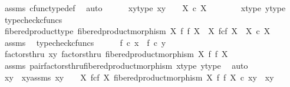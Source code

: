 \begin{isabellebody}
\ assms{\isacharparenleft}{\kern0pt}{}{\isacharparenright}{\kern0pt}\ cfunc{\isacharunderscore}{\kern0pt}type{\isacharunderscore}{\kern0pt}def\ \isamarkupfalse%
\ auto\isanewline
\isanewline
\ \ \ \ \isamarkupfalse%
\ x{\isacharunderscore}{\kern0pt}y{\isacharunderscore}{\kern0pt}type{\isacharcolon}{\kern0pt}\ {\isachardoublequoteopen}{\isasymlangle}x{\isacharcomma}{\kern0pt}y{\isasymrangle}\ {\isacharcolon}{\kern0pt}\ {\isasymone}\ {\isasymrightarrow}\ X\ {\isasymtimes}\isactrlsub c\ X{\isachardoublequoteclose}\isanewline
\ \ \ \ \ \ \isamarkupfalse%
\ x{\isacharunderscore}{\kern0pt}type{}\ y{\isacharunderscore}{\kern0pt}type{}\ \isamarkupfalse%
\ {\isacharparenleft}{\kern0pt}typecheck{\isacharunderscore}{\kern0pt}cfuncs{\isacharparenright}{\kern0pt}\isanewline
\ \ \ \ \isamarkupfalse%
\ fibered{\isacharunderscore}{\kern0pt}product{\isacharunderscore}{\kern0pt}type{\isacharcolon}{\kern0pt}\ {\isachardoublequoteopen}fibered{\isacharunderscore}{\kern0pt}product{\isacharunderscore}{\kern0pt}morphism\ X\ f\ f\ X\ {\isacharcolon}{\kern0pt}\ X\ \isactrlbsub f\isactrlesub {\isasymtimes}\isactrlsub c\isactrlbsub f\isactrlesub \ X\ {\isasymrightarrow}\ X\ {\isasymtimes}\isactrlsub c\ X{\isachardoublequoteclose}\isanewline
\ \ \ \ \ \ \isamarkupfalse%
\ assms\ \isamarkupfalse%
\ typecheck{\isacharunderscore}{\kern0pt}cfuncs\isanewline
\isanewline
\ \ \ \ \isamarkupfalse%
\ {\isachardoublequoteopen}f\ {\isasymcirc}\isactrlsub c\ x\ {\isacharequal}{\kern0pt}\ f\ {\isasymcirc}\isactrlsub c\ y{\isachardoublequoteclose}\isanewline
\ \ \ \ \isamarkupfalse%
\ \isamarkupfalse%
\ factorsthru{\isacharcolon}{\kern0pt}\ {\isachardoublequoteopen}{\isasymlangle}x{\isacharcomma}{\kern0pt}y{\isasymrangle}\ factorsthru\ fibered{\isacharunderscore}{\kern0pt}product{\isacharunderscore}{\kern0pt}morphism\ X\ f\ f\ X{\isachardoublequoteclose}\isanewline
\ \ \ \ \ \ \isamarkupfalse%
\ assms{\isacharparenleft}{\kern0pt}{}{\isacharparenright}{\kern0pt}\ pair{\isacharunderscore}{\kern0pt}factorsthru{\isacharunderscore}{\kern0pt}fibered{\isacharunderscore}{\kern0pt}product{\isacharunderscore}{\kern0pt}morphism\ x{\isacharunderscore}{\kern0pt}type{}\ y{\isacharunderscore}{\kern0pt}type{}\ \isamarkupfalse%
\ auto\isanewline
\ \ \ \ \isamarkupfalse%
\ \isamarkupfalse%
\ xy\ \ xy{\isacharunderscore}{\kern0pt}assms{\isacharcolon}{\kern0pt}\ {\isachardoublequoteopen}xy\ {\isacharcolon}{\kern0pt}\ {\isasymone}\ {\isasymrightarrow}\ X\ \isactrlbsub f\isactrlesub {\isasymtimes}\isactrlsub c\isactrlbsub f\isactrlesub \ X{\isachardoublequoteclose}\ {\isachardoublequoteopen}fibered{\isacharunderscore}{\kern0pt}product{\isacharunderscore}{\kern0pt}morphism\ X\ f\ f\ X\ {\isasymcirc}\isactrlsub c\ xy\ {\isacharequal}{\kern0pt}\ {\isasymlangle}x{\isacharcomma}{\kern0pt}y{\isasymrangle}{\isachardoublequoteclose}\isanewline

\end{isabellebody}
